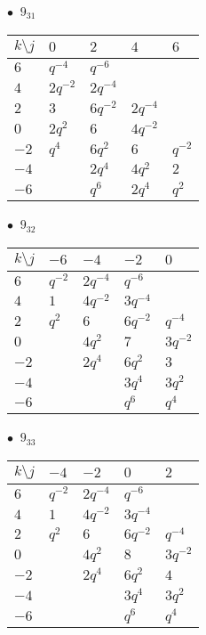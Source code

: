 %
\begin{minipage}{\linewidth}
$\bullet\ $ $9_{31}$ \vspace{0.5em} \\
\begin{tabular}{l|llll}
$k \setminus j$ & $0$ & $2$ & $4$ & $6$ \\
\hline
$6$ & $q^{-4}$ & $q^{-6}$ &  &  \\
$4$ & $2q^{-2}$ & $2q^{-4}$ &  &  \\
$2$ & $3$ & $6q^{-2}$ & $2q^{-4}$ &  \\
$0$ & $2q^{2}$ & $6$ & $4q^{-2}$ &  \\
$-2$ & $q^{4}$ & $6q^{2}$ & $6$ & $q^{-2}$ \\
$-4$ &  & $2q^{4}$ & $4q^{2}$ & $2$ \\
$-6$ &  & $q^{6}$ & $2q^{4}$ & $q^{2}$ \\
\end{tabular}
\vspace{2em}
\end{minipage}
%
\begin{minipage}{\linewidth}
$\bullet\ $ $9_{32}$ \vspace{0.5em} \\
\begin{tabular}{l|llll}
$k \setminus j$ & $-6$ & $-4$ & $-2$ & $0$ \\
\hline
$6$ & $q^{-2}$ & $2q^{-4}$ & $q^{-6}$ &  \\
$4$ & $1$ & $4q^{-2}$ & $3q^{-4}$ &  \\
$2$ & $q^{2}$ & $6$ & $6q^{-2}$ & $q^{-4}$ \\
$0$ &  & $4q^{2}$ & $7$ & $3q^{-2}$ \\
$-2$ &  & $2q^{4}$ & $6q^{2}$ & $3$ \\
$-4$ &  &  & $3q^{4}$ & $3q^{2}$ \\
$-6$ &  &  & $q^{6}$ & $q^{4}$ \\
\end{tabular}
\vspace{2em}
\end{minipage}
%
\begin{minipage}{\linewidth}
$\bullet\ $ $9_{33}$ \vspace{0.5em} \\
\begin{tabular}{l|llll}
$k \setminus j$ & $-4$ & $-2$ & $0$ & $2$ \\
\hline
$6$ & $q^{-2}$ & $2q^{-4}$ & $q^{-6}$ &  \\
$4$ & $1$ & $4q^{-2}$ & $3q^{-4}$ &  \\
$2$ & $q^{2}$ & $6$ & $6q^{-2}$ & $q^{-4}$ \\
$0$ &  & $4q^{2}$ & $8$ & $3q^{-2}$ \\
$-2$ &  & $2q^{4}$ & $6q^{2}$ & $4$ \\
$-4$ &  &  & $3q^{4}$ & $3q^{2}$ \\
$-6$ &  &  & $q^{6}$ & $q^{4}$ \\
\end{tabular}
\vspace{2em}
\end{minipage}
